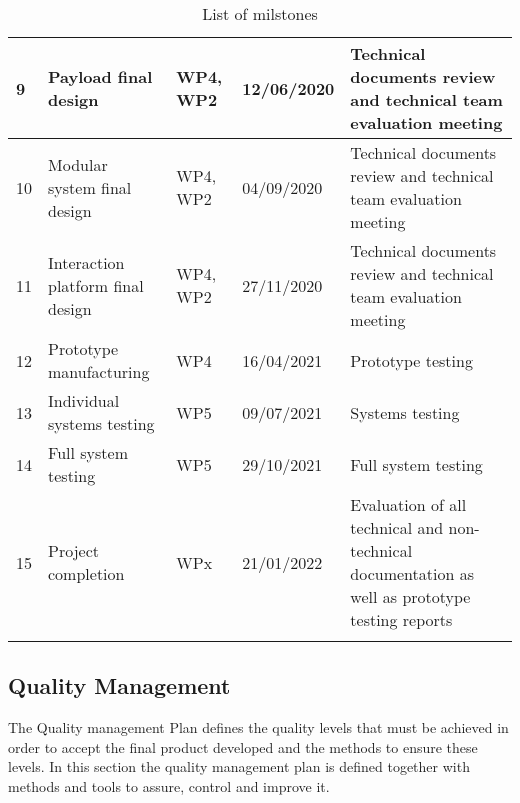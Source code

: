 \begin{longtable}[H]{p{1.9cm} p{3cm} p{2.2cm} p{2cm} l }
 	\midrule
 
 	9 & Payload final design & WP4, WP2 & 12/06/2020 & Technical documents review and technical team evaluation meeting \vspace{0.2cm} \\
 
 	\midrule
 
 	10 & Modular system final design & WP4, WP2 & 04/09/2020 & Technical documents review and technical team evaluation meeting \vspace{0.2cm} \\
	
	\midrule

	11 & Interaction platform final design & WP4, WP2 & 27/11/2020 & Technical documents review and technical team evaluation meeting \vspace{0.2cm} \\

	\midrule

	12 & Prototype manufacturing & WP4 & 16/04/2021 & Prototype testing \vspace{0.2cm} \\

	\midrule

	13 & Individual systems testing & WP5 & 09/07/2021 & Systems testing \vspace{0.2cm} \\
	 
	\midrule

	14 & Full system testing & WP5 & 29/10/2021 & Full system testing \vspace{0.2cm} \\

	\midrule

	15 & Project completion & WPx & 21/01/2022 & Evaluation of all technical and non-technical documentation as well as prototype testing reports \vspace{0.2cm} \\

	\bottomrule[2pt]
	
	\caption{List of milstones}
	\label{workpackages}
\end{longtable}

\subsection{Quality Management}

The Quality management Plan defines the quality levels that must be achieved in order to accept the final product developed and the methods to ensure these levels. In this section the quality management plan is defined together with methods and tools to assure, control and improve it.





